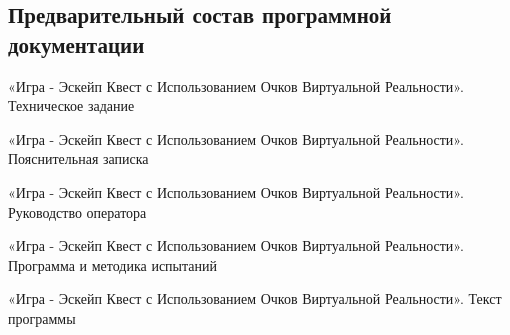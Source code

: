 \subsection{Предварительный состав программной документации}
\begin{my_enumerate}
	\item «Игра - Эскейп Квест с Использованием Очков Виртуальной Реальности». Техническое задание
	\item «Игра - Эскейп Квест с Использованием Очков Виртуальной Реальности». Пояснительная записка
	\item «Игра - Эскейп Квест с Использованием Очков Виртуальной Реальности». Руководство оператора
	\item «Игра - Эскейп Квест с Использованием Очков Виртуальной Реальности». Программа и методика испытаний
	\item «Игра - Эскейп Квест с Использованием Очков Виртуальной Реальности».  Текст программы
\end{my_enumerate}

